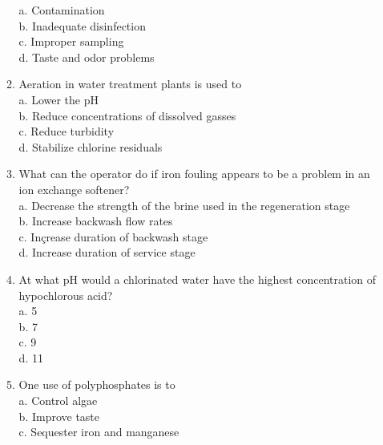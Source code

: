 \documentclass[10pt]{article}
\begin{document}
\begin{enumerate}
\begin{enumerate}
a. Contamination\\

b. Inadequate disinfection\\

c. Improper sampling\\

d. Taste and odor problems\\

\item Aeration in water treatment plants is used to\\

a. Lower the $\mathrm{pH}$\\

b. Reduce concentrations of dissolved gasses\\

c. Reduce turbidity\\

d. Stabilize chlorine residuals


\item What can the operator do if iron fouling appears to be a problem in an ion exchange softener?\\

a. Decrease the strength of the brine used in the regeneration stage\\

b. Increase backwash flow rates\\

c. Inçrease duration of backwash stage\\

d. Increase duration of service stage\\


  \item At what $\mathrm{pH}$ would a chlorinated water have the highest concentration of hypochlorous acid?\\
a. 5\\
b. 7\\
c. 9\\
d. 11\\

\item One use of polyphosphates is to\\



a. Control algae\\

b. Improve taste\\

c. Sequester iron and manganese\\


\end{enumerate}
\end{enumerate}
\end{document}
